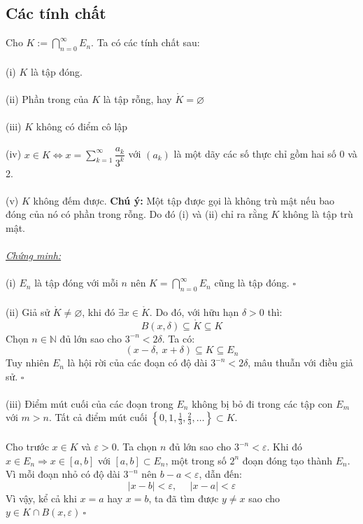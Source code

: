 \documentclass[10.5pt, a4paper]{article}
\begin{document}
\subsection{Các tính chất}
\vspace{1mm}
Cho $K:=\displaystyle\bigcap_{n=0}^\infty E_n$. Ta có các tính chất sau:\\\\
(i) $K$ là tập đóng.\\\\
(ii) Phần trong của $K$ là tập rỗng, hay $\mathring K=\varnothing$\\\\
(iii) $K$ không có điểm cô lập\\\\
(iv) $x\in K\Longleftrightarrow x=\displaystyle\sum_{k=1}^\infty\dfrac{a_k}{3^k}$ với $(a_k)$ là một dãy các số thực chỉ gồm hai số 0 và 2.\\\\
(v) $K$ không đếm được.
\newpage
\textbf{Chú ý:} Một tập được gọi là không trù mật nếu bao đóng của nó có phần trong rỗng. Do đó (i) và (ii) chỉ ra rằng $K$ không là tập trù mật.\\\\
\underline{\textit{Chứng minh:}}\\\\
(i) $E_n$ là tập đóng với mỗi $n$ nên $K=\displaystyle\bigcap_{n=0}^\infty E_n$ cũng là tập đóng. $\square$\\\\
(ii) Giả sử $\mathring K\ne\varnothing$, khi đó $\exists x\in\mathring K$. Do đó, với hữu hạn $\delta>0$ thì: $$B(x,\delta)\subseteq\mathring K\subseteq K$$
Chọn $n\in\mathbb N$ đủ lớn sao cho $3^{-n}<2\delta$. Ta có: $$(x-\delta,~x+\delta)\subseteq K\subseteq E_n$$
Tuy nhiên $E_n$ là hội rời của các đoạn có độ dài $3^{-n}<2\delta$, mâu thuẫn với điều giả sử. $\square$\\\\
(iii) Điểm mút cuối của các đoạn trong $E_n$ không bị bỏ đi trong các tập con $E_m$ với $m>n$. Tất cả điểm mút cuối $\left\{0,1,\frac13,\frac23,\dots\right\}\subset K$.\\\\
Cho trước $x\in K$ và $\varepsilon>0$. Ta chọn $n$ đủ lớn sao cho $3^{-n}<\varepsilon$. Khi đó $x\in E_n\Longrightarrow x\in[a,b]$ với $[a,b]\subset E_n$, một trong số $2^n$ đoạn đóng tạo thành $E_n$. Vì mỗi đoạn nhỏ có độ dài $3^{-n}$ nên $b-a<\varepsilon$, dẫn đến: $$|x-b|<\varepsilon,~~~~~~|x-a|<\varepsilon$$
Vì vậy, kể cả khi $x=a$ hay $x=b$, ta đã tìm được $y\ne x$ sao cho $y\in K\cap B(x,\varepsilon)~\square$\\\\
\end{document}
